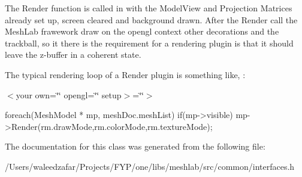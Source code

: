 The Render function is called in with the Model\+View and Projection Matrices already set up, screen cleared and background drawn. After the Render call the Mesh\+Lab frawework draw on the opengl context other decorations and the trackball, so it there is the requirement for a rendering plugin is that it should leave the z-\/buffer in a coherent state.

The typical rendering loop of a Render plugin is something like, \+:

$<$your own=\char`\"{}\char`\"{} opengl=\char`\"{}\char`\"{} setup$>$=\char`\"{}\char`\"{}$>$ \begin{DoxyVerb}            foreach(MeshModel * mp, meshDoc.meshList)
                            {
                                    if(mp->visible) mp->Render(rm.drawMode,rm.colorMode,rm.textureMode);
                            }\end{DoxyVerb}
 

The documentation for this class was generated from the following file\+:\begin{DoxyCompactItemize}
\item 
/\+Users/waleedzafar/\+Projects/\+F\+Y\+P/one/libs/meshlab/src/common/interfaces.\+h\end{DoxyCompactItemize}
